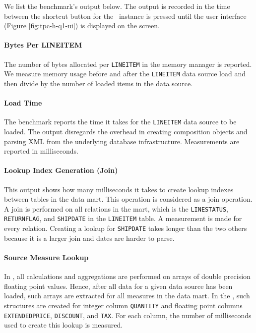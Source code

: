 We list the benchmark's output below. The output is recorded in the time between the shortcut button for the \gd~instance is pressed until the user interface (Figure \ref{fig:tpc-h-q1-ui}) is displayed on the screen.

\paragraph{Bytes Per LINEITEM}

The number of bytes allocated per \texttt{LINEITEM} in the memory manager is reported. We measure memory usage before and after the \texttt{LINEITEM} data source load and then divide by the number of loaded items in the data source.

\paragraph{Load Time}

The benchmark reports the time it takes for the \texttt{LINEITEM} data source to be loaded. The output disregards the overhead in creating composition objects and parsing XML from the underlying database infrastructure. Measurements are reported in milliseconds.

\paragraph{Lookup Index Generation (Join)}

This output shows how many milliseconds it takes to create lookup indexes between tables in the data mart. This operation is considered as a join operation. A join is performed on all relations in the mart, which is the \texttt{LINESTATUS}, \texttt{RETURNFLAG}, and \texttt{SHIPDATE} in the \texttt{LINEITEM} table. A measurement is made for every relation. Creating a lookup for \texttt{SHIPDATE} takes longer than the two others because it is a larger join and dates are harder to parse.

\paragraph{Source Measure Lookup}

In \gd, all calculations and aggregations are performed on arrays of double precision floating point values. Hence, after all data for a given data source has been loaded, such arrays are extracted for all measures in the data mart. In the \tpchdl, such structures are created for integer column \texttt{QUANTITY} and floating point columns \texttt{EXTENDEDPRICE}, \texttt{DISCOUNT}, and \texttt{TAX}. For each column, the number of milliseconds used to create this lookup is measured.

